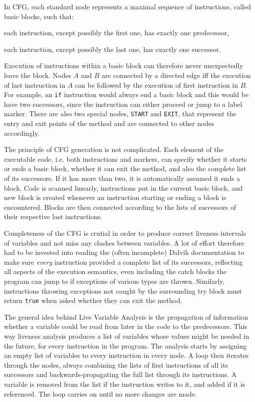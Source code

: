 \documentclass[12pt,twoside,notitlepage]{report}
\begin{document}
In CFG, each standard node represents a maximal sequence of instructions, called basic blocks, such that:
\begin{inparaenum}[(i)]
\item each instruction, except possibly the first one, has exactly one predecessor,
\item each instruction, except possibly the last one, has exactly one successor.
\end{inparaenum}
Execution of instructions within a basic block can therefore never unexpectedly leave the block. Nodes $A$ and $B$ are connected by a directed edge iff the execution of last instruction in $A$ can be followed by the execution of first instruction in $B$. For example, an \verb$if$ instruction would always end a basic block and this would be have two successors, since the instruction can either proceed or jump to a label marker. There are also two special nodes, \verb$START$ and \verb$EXIT$, that represent the entry and exit points of the method and are connected to other nodes accordingly.

The principle of CFG generation is not complicated. Each element of the executable code, i.e. both instructions and markers, can specify whether it starts or ends a basic block, whether it can exit the method, and also the complete list of its successors. If it has more than two, it is automatically assumed it ends a block. Code is scanned linearly, instructions put in the current basic block, and new block is created whenever an instruction starting or ending a block is encountered. Blocks are then connected according to the lists of successors of their respective last instructions.

Completeness of the CFG is crutial in order to produce correct liveness intervals of variables and not miss any clashes between variables. A lot of effort therefore had to be invested into reading the (often incomplete) Dalvik documentation to make sure \emph{every} instruction provided a complete list of its successors, reflecting all aspects of the execution semantics, even including the catch blocks the program can jump to if exceptions of various types are thrown. Similarly, instructions throwing exceptions not caught by the surrounding try block must return \verb$true$ when asked whether they can exit the method.

The general idea behind Live Variable Analysis is the propagation of information whether a variable could be read from later in the code to the predecessors. This way liveness analysis produces a list of variables whose values might be needed in the future, for every instruction in the program. The analysis starts by assigning an empty list of variables to every instruction in every node. A loop then iterates through the nodes, always combining the lists of first instructions of all its successors and backwards-propagating the full list through its instructions. A variable is removed from the list if the instruction writes to it, and added if it is referenced. The loop carries on until no more changes are made.
\end{document}
